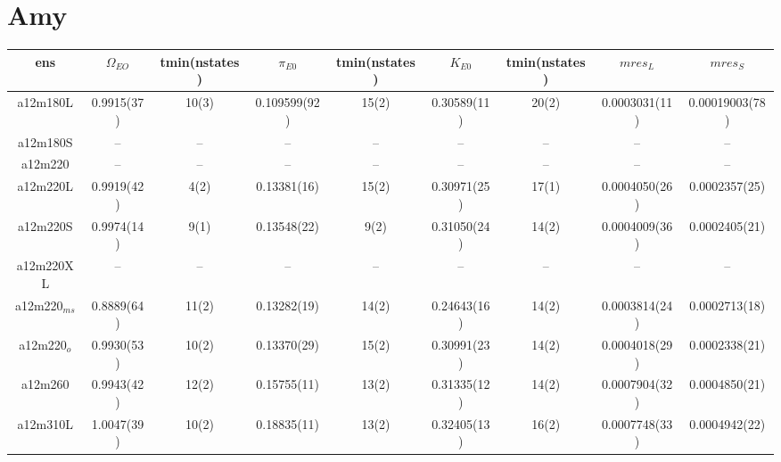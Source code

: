 \documentclass{article}
\begin{document}
\clearpage
\section*{Amy}
\begin{table}[h!]
  \centering
 \setlength{\arrayrulewidth}{0.5mm}
\setlength{\tabcolsep}{13pt}
\renewcommand{\arraystretch}{2}
 \begin{tabular}{|| c |c | c | c | c | c | c | c | c ||} 
 \hline
 ens &  $\Omega_{EO}$ & tmin(nstates) & $\pi_{E0}$  & tmin(nstates)& $K_{E0}$  & tmin(nstates) & $mres_{L}$ & $mres_{S}$\\ [0.8ex] 
 \hline\hline
 a12m180L 
 & {0.9915(37)}   &   {10(3)} & {0.109599(92)}   & {15(2)}   & {0.30589(11)}  & {20(2)}   & {0.0003031(11)}  & {0.00019003(78)}  \\ 
 \hline
 a12m180S 
 & {--}   &   {--} & {--}   & {--}   & {--}  & {--}   & {--}  & {--}  \\
 \hline
 a12m220 
 & {--}   &   {--} & {--}   & {--}   & {--}  & {--}   & {--}  & {--}  \\
 \hline
 a12m220L 
 & {0.9919(42)}   &   {4(2)} & {0.13381(16)}   & {15(2)}   & {0.30971(25)}  & {17(1)}   & {0.0004050(26)}  & {0.0002357(25)}  \\
 \hline
 a12m220S
 & {0.9974(14)}   &   {9(1)} & {0.13548(22)}   & {9(2)}   & {0.31050(24)}  & {14(2)}   & {0.0004009(36)}  & {0.0002405(21)}  \\
 \hline
 a12m220XL
 & {--}   &   {--} & {--}   & {--}   & {--}  & {--}   & {--}  & {--}  \\
 \hline
 a12m220$_{ms}$
 & {0.8889(64)}   &   {11(2)} & {0.13282(19)}   & {14(2)}   & {0.24643(16)}  & {14(2)}   & {0.0003814(24)}  & {0.0002713(18)}  \\
 \hline
 a12m220$_o$ 
 & {0.9930(53)}   &   {10(2)} & {0.13370(29)}   & {15(2)}   & {0.30991(23)}  & {14(2)}   & {0.0004018(29)}  & {0.0002338(21)}  \\
 \hline
 a12m260 
 & {0.9943(42)}   &   {12(2)} & {0.15755(11)}   & {13(2)}   & {0.31335(12)}  & {14(2)}   & {0.0007904(32)}  & {0.0004850(21)}  \\
 \hline

 a12m310L
 & {1.0047(39)}   &   {10(2)} & {0.18835(11)}   & {13(2)}   & {0.32405(13)}  & {16(2)}   & {0.0007748(33)}  & {0.0004942(22)}  \\
 \hline
 
 
 \end{tabular}
\end{table}
\clearpage
\end{document}
